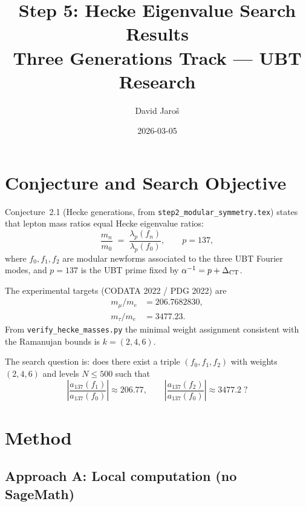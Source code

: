\documentclass[12pt,a4paper]{article}
\title{%
  Step 5: Hecke Eigenvalue Search Results\\
  \large Three Generations Track --- UBT Research}
\author{David Jaroš}
\date{2026-03-05}
\begin{document}
\maketitle
\tableofcontents

\section{Conjecture and Search Objective}

Conjecture~2.1 (Hecke generations, from \texttt{step2\_modular\_symmetry.tex})
states that lepton mass ratios equal Hecke eigenvalue ratios:
\begin{equation}
  \label{eq:conjecture21}
  \frac{m_n}{m_0} \;=\; \frac{\lambda_p(f_n)}{\lambda_p(f_0)}, \qquad p = 137,
\end{equation}
where $f_0, f_1, f_2$ are modular newforms associated to the three UBT Fourier
modes, and $p = 137$ is the UBT prime fixed by $\alpha^{-1} = p + \Delta_{\rm CT}$.

The experimental targets (CODATA 2022 / PDG 2022) are
\begin{align}
  m_\mu / m_e   &= 206.7682830, \label{eq:mu_ratio}\\
  m_\tau / m_e  &= 3477.23.     \label{eq:tau_ratio}
\end{align}
From \texttt{verify\_hecke\_masses.py} the minimal weight assignment consistent
with the Ramanujan bounds is $k = (2, 4, 6)$.

The search question is: does there exist a triple $(f_0, f_1, f_2)$ with
weights $(2, 4, 6)$ and levels $N \le 500$ such that
\begin{equation}
  \left|\frac{a_{137}(f_1)}{a_{137}(f_0)}\right| \approx 206.77, \qquad
  \left|\frac{a_{137}(f_2)}{a_{137}(f_0)}\right| \approx 3477.2 \;?
\end{equation}

\section{Method}

\subsection{Approach A: Local computation (no SageMath)}
\end{document}
